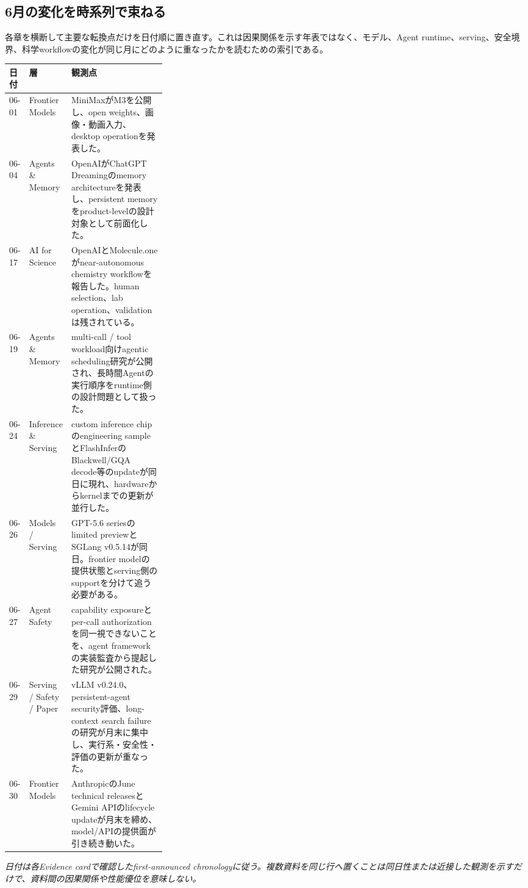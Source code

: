 \subsection*{6月の変化を時系列で束ねる}
\noindent 各章を横断して主要な転換点だけを日付順に置き直す。これは因果関係を示す年表ではなく、モデル、Agent runtime、serving、安全境界、科学workflowの変化が同じ月にどのように重なったかを読むための索引である。
\medskip
\begin{center}
\scriptsize
\renewcommand{\arraystretch}{1.08}
\begin{tabularx}{\linewidth}{@{}p{0.10\linewidth}p{0.20\linewidth}X@{}}
\toprule
日付 & 層 & 観測点 \\
\midrule
06-01 & Frontier Models & MiniMaxがM3を公開し、open weights、画像・動画入力、desktop operationを発表した。 \cite{src-d8e13386974c} \\
06-04 & Agents \& Memory & OpenAIがChatGPT Dreamingのmemory architectureを発表し、persistent memoryをproduct-levelの設計対象として前面化した。 \cite{src-c3ab33c62226} \\
06-17 & AI for Science & OpenAIとMolecule.oneがnear-autonomous chemistry workflowを報告した。human selection、lab operation、validationは残されている。 \cite{src-5ff2f715f1e6} \\
06-19 & Agents \& Memory & multi-call / tool workload向けagentic scheduling研究が公開され、長時間Agentの実行順序をruntime側の設計問題として扱った。 \cite{src-e8d9fd84bddc} \\
06-24 & Inference \& Serving & custom inference chipのengineering sampleとFlashInferのBlackwell/GQA decode等のupdateが同日に現れ、hardwareからkernelまでの更新が並行した。 \cite{src-855db08b75f6,src-272a6dac5bcc} \\
06-26 & Models / Serving & GPT-5.6 seriesのlimited previewとSGLang v0.5.14が同日。frontier modelの提供状態とserving側のsupportを分けて追う必要がある。 \cite{src-30f48121decc,src-538cecdad845} \\
06-27 & Agent Safety & capability exposureとper-call authorizationを同一視できないことを、agent frameworkの実装監査から提起した研究が公開された。 \cite{src-02da0db00c2d} \\
06-29 & Serving / Safety / Paper & vLLM v0.24.0、persistent-agent security評価、long-context search failureの研究が月末に集中し、実行系・安全性・評価の更新が重なった。 \cite{src-6cc910fb0183,src-6da0c5a88fa4,src-8603fd60d637} \\
06-30 & Frontier Models & AnthropicのJune technical releasesとGemini APIのlifecycle updateが月末を締め、model/APIの提供面が引き続き動いた。 \cite{src-f6aa679babd7,src-a24fd97eb3d0} \\
\bottomrule
\end{tabularx}
\renewcommand{\arraystretch}{1.0}
\end{center}
\scriptsize
\noindent\textit{日付は各Evidence cardで確認したfirst-announced chronologyに従う。複数資料を同じ行へ置くことは同日性または近接した観測を示すだけで、資料間の因果関係や性能優位を意味しない。}
\normalsize

